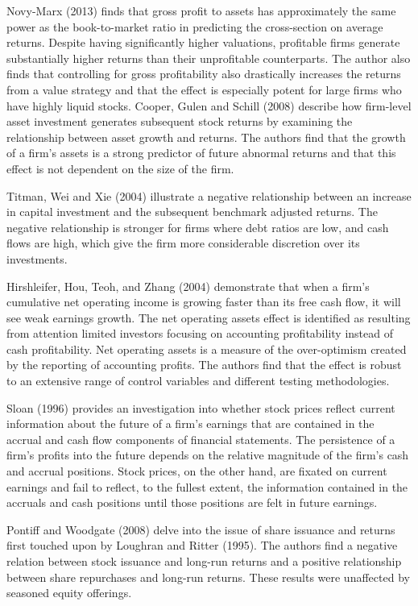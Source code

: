 \documentclass[a4paper,12pt]{article}                 %
\begin{document}
Novy-Marx (2013) finds that gross profit to assets has approximately the same power as the book-to-market ratio in predicting the cross-section on average returns. Despite having significantly higher valuations, profitable firms generate substantially higher returns than their unprofitable counterparts. The author also finds that controlling for gross profitability also drastically increases the returns from a value strategy and that the effect is especially potent for large firms who have highly liquid stocks. 
Cooper, Gulen and Schill (2008) describe how firm-level asset investment generates subsequent stock returns by examining the relationship between asset growth and returns. The authors find that the growth of a firm's assets is a strong predictor of future abnormal returns and that this effect is not dependent on the size of the firm. 

Titman, Wei and Xie (2004) illustrate a negative relationship between an increase in capital investment and the subsequent benchmark adjusted returns. The negative relationship is stronger for firms where debt ratios are low, and cash flows are high, which give the firm more considerable discretion over its investments.

Hirshleifer, Hou, Teoh, and Zhang (2004) demonstrate that when a firm’s cumulative net operating income is growing faster than its free cash flow, it will see weak earnings growth. The net operating assets effect is identified as resulting from attention limited investors focusing on accounting profitability instead of cash profitability. Net operating assets is a measure of the over-optimism created by the reporting of accounting profits. The authors find that the effect is robust to an extensive range of control variables and different testing methodologies. 

Sloan (1996) provides an investigation into whether stock prices reflect current information about the future of a firm’s earnings that are contained in the accrual and cash flow components of financial statements. The persistence of a firm’s profits into the future depends on the relative magnitude of the firm's cash and accrual positions. Stock prices, on the other hand, are fixated on current earnings and fail to reflect, to the fullest extent, the information contained in the accruals and cash positions until those positions are felt in future earnings. 

Pontiff and Woodgate (2008) delve into the issue of share issuance and returns first touched upon by Loughran and Ritter (1995). The authors find a negative relation between stock issuance and long-run returns and a positive relationship between share repurchases and long-run returns. These results were unaffected by seasoned equity offerings. 
\end{document}
